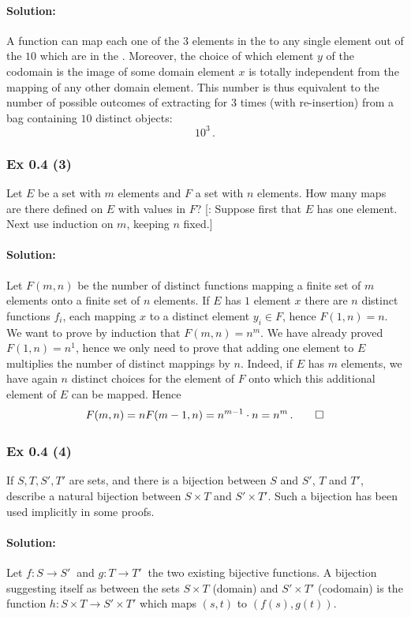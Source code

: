 {{\paragraph{Solution:}{
A function can map each one of the $3$ elements in the  to any single element out of the $10$ which are in the .
Moreover, the choice of which element $y$ of the codomain is the image of some domain element $x$ is totally independent from the mapping of any other domain element. This number is thus equivalent to the number of possible outcomes of extracting for $3$ times (with re-insertion) from a bag containing $10$ distinct objects: $$10^3\,.$$
}

\subsubsection{Ex 0.4 (3)}\label{sec:Ex_0.4.3}
Let $E$ be a set with $m$ elements and $F$ a set with $n$ elements. How many maps are there defined on $E$ with values in $F$?
[: Suppose first that $E$ has one element. Next use induction on $m$, keeping $n$ fixed.]
%
%
\paragraph{Solution:}{
Let $F(m, n)$ be the number of distinct functions mapping a finite set of $m$ elements onto a finite set of $n$ elements.
If $E$ has $1$ element $x$ there are $n$ distinct functions $f_i$, each mapping $x$ to a distinct element $y_i \in F$, hence  $F(1, n) = n$.
We want to prove  by induction that $F(m, n) = n^m$. We have already proved $F(1, n) = n^1$, hence we only need to prove that adding one element to $E$ multiplies the number of distinct mappings by $n$. Indeed, if $E$ has $m$ elements, we have again $n$ distinct choices for the element of $F$ onto which this additional element of $E$ can be mapped. Hence 
$$F(m, n) = n F(m-1, n) = n^{m-1} \cdot n = n^m\,.\qed$$ 
}

\subsubsection{Ex 0.4 (4)}\label{sec:Ex_0.4.4}
If $S, T, S', T'$ are sets, and there is a bijection between $S$ and $S'$, $T$ and $T'$, describe a natural bijection between 
$S \times T$ and $S' \times T'$. Such a bijection has been used implicitly in some proofs. 
%
%
\paragraph{Solution:}{
Let $f : S \rightarrow S'\:$ and $g : T \rightarrow T'\:$ the two existing bijective functions. 
A bijection suggesting itself as  between the sets $S \times T$ (domain) and $S' \times T'$ (codomain) is the 
function $h: S \times T \rightarrow S' \times T'$ which maps $(s, t)$ to $(f(s), g(t))$.
}


}}
